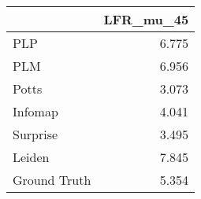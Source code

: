 \begin{tabular}{lr}
\toprule
{} & LFR_mu_45 \\
\midrule
PLP          &     6.775 \\
PLM          &     6.956 \\
Potts        &     3.073 \\
Infomap      &     4.041 \\
Surprise     &     3.495 \\
Leiden       &     7.845 \\
Ground Truth &     5.354 \\
\bottomrule
\end{tabular}
